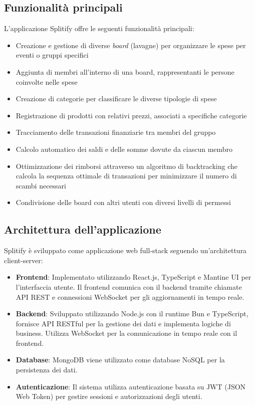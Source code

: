\documentclass[11pt]{article}
\begin{document}
\subsection{Funzionalità principali}
L'applicazione Splitify offre le seguenti funzionalità principali:
\begin{itemize}
    \item Creazione e gestione di diverse \textit{board} (lavagne) per organizzare le spese per eventi o gruppi specifici
    \item Aggiunta di membri all'interno di una board, rappresentanti le persone coinvolte nelle spese
    \item Creazione di categorie per classificare le diverse tipologie di spese
    \item Registrazione di prodotti con relativi prezzi, associati a specifiche categorie
    \item Tracciamento delle transazioni finanziarie tra membri del gruppo
    \item Calcolo automatico dei saldi e delle somme dovute da ciascun membro
    \item Ottimizzazione dei rimborsi attraverso un algoritmo di backtracking che calcola la sequenza ottimale di transazioni per minimizzare il numero di scambi necessari
    \item Condivisione delle board con altri utenti con diversi livelli di permessi
\end{itemize}

\subsection{Architettura dell'applicazione}
Splitify è sviluppato come applicazione web full-stack seguendo un'architettura client-server:

\begin{itemize}
    \item \textbf{Frontend}: Implementato utilizzando React.js, TypeScript e Mantine UI per l'interfaccia utente. Il frontend comunica con il backend tramite chiamate API REST e connessioni WebSocket per gli aggiornamenti in tempo reale.
    \item \textbf{Backend}: Sviluppato utilizzando Node.js con il runtime Bun e TypeScript, fornisce API RESTful per la gestione dei dati e implementa logiche di business. Utilizza WebSocket per la comunicazione in tempo reale con il frontend.
    \item \textbf{Database}: MongoDB viene utilizzato come database NoSQL per la persistenza dei dati.
    \item \textbf{Autenticazione}: Il sistema utilizza autenticazione basata su JWT (JSON Web Token) per gestire sessioni e autorizzazioni degli utenti.
\end{itemize}
\end{document}
